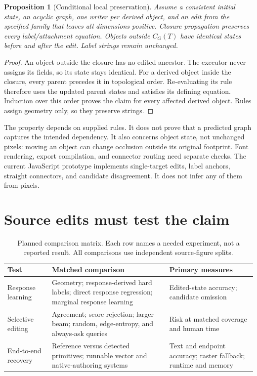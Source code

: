\documentclass{article}
\newtheorem{proposition}{Proposition}
\begin{document}
\begin{proposition}[Conditional local preservation]
Assume a consistent initial state, an acyclic graph, one writer per derived object, and an edit from the specified family that leaves all dimensions positive. Closure propagation preserves every label/attachment equation. Objects outside $C_G(T)$ have identical states before and after the edit. Label strings remain unchanged.
\end{proposition}
\begin{proof}
An object outside the closure has no edited ancestor. The executor never assigns its fields, so its state stays identical. For a derived object inside the closure, every parent precedes it in topological order. Re-evaluating its rule therefore uses the updated parent states and satisfies its defining equation. Induction over this order proves the claim for every affected derived object. Rules assign geometry only, so they preserve strings.
\end{proof}

The property depends on supplied rules. It does not prove that a predicted graph captures the intended dependency. It also concerns object state, not unchanged pixels: moving an object can change occlusion outside its original footprint. Font rendering, export compilation, and connector routing need separate checks. The current JavaScript prototype implements single-target edits, label anchors, straight connectors, and candidate disagreement. It does not infer any of them from pixels.

\section{Source edits must test the claim}
\begin{table}[t]
\caption{Planned comparison matrix. Each row names a needed experiment, not a reported result. All comparisons use independent source-figure splits.}
\label{tab:plan}
\centering\small
\renewcommand{\arraystretch}{1.25}
\begin{tabular}{@{}p{}p{}p{}@{}}
\toprule
Test & Matched comparison & Primary measures \\
\midrule
Response learning & Geometry; response-derived hard labels; direct response regression; marginal response learning & Edited-state accuracy; candidate omission \\
\addlinespace[3pt]
Selective editing & Agreement; score rejection; larger beam; random, edge-entropy, and always-ask queries & Risk at matched coverage and human time \\
\addlinespace[3pt]
End-to-end recovery & Reference versus detected primitives; runnable vector and native-authoring systems & Text and endpoint accuracy; raster fallback; runtime and memory \\
\bottomrule
\end{tabular}
\end{table}
\end{document}
